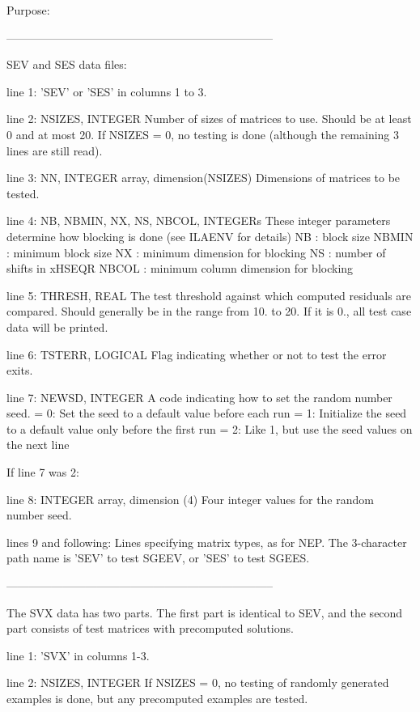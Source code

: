 \begin{DoxyParagraph}{Purpose\+: }
\begin{DoxyVerb}
-----------------------------------------------------------------------

 SEV and SES data files:

 line 1:  'SEV' or 'SES' in columns 1 to 3.

 line 2:  NSIZES, INTEGER
          Number of sizes of matrices to use. Should be at least 0
          and at most 20. If NSIZES = 0, no testing is done
          (although the remaining  3 lines are still read).

 line 3:  NN, INTEGER array, dimension(NSIZES)
          Dimensions of matrices to be tested.

 line 4:  NB, NBMIN, NX, NS, NBCOL, INTEGERs
          These integer parameters determine how blocking is done
          (see ILAENV for details)
          NB     : block size
          NBMIN  : minimum block size
          NX     : minimum dimension for blocking
          NS     : number of shifts in xHSEQR
          NBCOL  : minimum column dimension for blocking

 line 5:  THRESH, REAL
          The test threshold against which computed residuals are
          compared. Should generally be in the range from 10. to 20.
          If it is 0., all test case data will be printed.

 line 6:  TSTERR, LOGICAL
          Flag indicating whether or not to test the error exits.

 line 7:  NEWSD, INTEGER
          A code indicating how to set the random number seed.
          = 0:  Set the seed to a default value before each run
          = 1:  Initialize the seed to a default value only before the
                first run
          = 2:  Like 1, but use the seed values on the next line

 If line 7 was 2:

 line 8:  INTEGER array, dimension (4)
          Four integer values for the random number seed.

 lines 9 and following:  Lines specifying matrix types, as for NEP.
          The 3-character path name is 'SEV' to test SGEEV, or
          'SES' to test SGEES.

-----------------------------------------------------------------------

 The SVX data has two parts. The first part is identical to SEV,
 and the second part consists of test matrices with precomputed
 solutions.

 line 1:  'SVX' in columns 1-3.

 line 2:  NSIZES, INTEGER
          If NSIZES = 0, no testing of randomly generated examples
          is done, but any precomputed examples are tested.


\end{DoxyVerb}
\end{DoxyParagraph}
